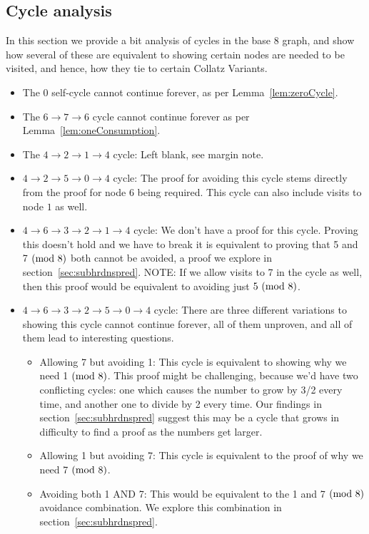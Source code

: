 \subsection{Cycle analysis} \label{subsubsec:cycleanalysis}
In this section we provide a bit analysis of cycles in the base 8 graph, and show how several of these are equivalent to showing certain nodes are needed to be visited, and hence, how they tie to certain Collatz Variants.
\begin{itemize}
    \item The 0 self-cycle cannot continue forever, as per Lemma~\ref{lem:zeroCycle}.
    \item The $6 \rightarrow 7 \rightarrow 6$ cycle cannot continue forever as per Lemma~\ref{lem:oneConsumption}.
    \item The $4 \rightarrow 2 \rightarrow 1 \rightarrow 4$ cycle: Left blank, see margin note. 
    \item $4 \rightarrow 2 \rightarrow 5 \rightarrow 0 \rightarrow 4$ cycle: The proof for avoiding this cycle stems directly from the proof for node $6$ being required. This cycle can also include visits to node $1$ as well.
    \item $4 \rightarrow 6 \rightarrow 3 \rightarrow 2 \rightarrow 1 \rightarrow 4$ cycle: We don't have a proof for this cycle. Proving this doesn't hold and we have to break it is equivalent to proving that 5 and 7$\ (\mathrm{mod}\ 8)$ both cannot be avoided, a proof we explore in section~\ref{sec:subhrdnspred}. NOTE: If we allow visits to 7 in the cycle as well, then this proof would be equivalent to avoiding just $5 \ (\mathrm{mod}\ 8)$.
    \item $4 \rightarrow 6 \rightarrow 3 \rightarrow 2 \rightarrow 5 \rightarrow 0 \rightarrow 4$ cycle: There are three different variations to showing this cycle cannot continue forever, all of them unproven, and all of them lead to interesting questions.
    \begin{itemize}
        \item Allowing 7 but avoiding 1: This cycle is equivalent to showing why we need 1$\ (\mathrm{mod}\ 8)$. This proof might be challenging, because we'd have two conflicting cycles: one which causes the number to grow by 3/2 every time, and another one to divide by 2 every time. Our findings in section~\ref{sec:subhrdnspred} suggest this may be a cycle that grows in difficulty to find a proof as the numbers get larger.
        \item Allowing 1 but avoiding 7: This cycle is equivalent to the proof of why we need 7$\ (\mathrm{mod}\ 8)$. 
        \item Avoiding both 1 AND 7: This would be equivalent to the 1 and 7$\ (\mathrm{mod}\ 8)$ avoidance combination. We explore this combination in section~\ref{sec:subhrdnspred}.
    \end{itemize}
\end{itemize}